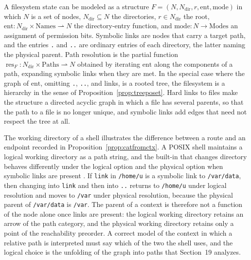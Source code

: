 \documentclass[11pt]{article}
\theoremstyle{definition}
\theoremstyle{remark}
\newcommand{\res}{\operatorname{res}}
\newcommand{\pfn}{\rightharpoonup}
\begin{document}
A filesystem state can be modeled as a structure $F=(N,N_{\mathrm{dir}},r,\mathrm{ent},\mathrm{mode})$ in which $N$ is a set of nodes, $N_{\mathrm{dir}}\subseteq N$ the directories, $r\in N_{\mathrm{dir}}$ the root, $\mathrm{ent}:N_{\mathrm{dir}}\times\mathrm{Names}\pfn N$ the directory-entry function, and $\mathrm{mode}:N\to\mathrm{Modes}$ an assignment of permission bits. Symbolic links are nodes that carry a target path, and the entries \texttt{.} and \texttt{..} are ordinary entries of each directory, the latter naming the physical parent. Path resolution is the partial function $\res_F:N_{\mathrm{dir}}\times\mathrm{Paths}\pfn N$ obtained by iterating $\mathrm{ent}$ along the components of a path, expanding symbolic links when they are met. In the special case where the graph of $\mathrm{ent}$, omitting \texttt{.}, \texttt{..}, and links, is a rooted tree, the filesystem is a hierarchy in the sense of Proposition~\ref{prop:treeposet}. Hard links to files make the structure a directed acyclic graph in which a file has several parents, so that the path to a file is no longer unique, and symbolic links add edges that need not respect the tree at all.

The working directory of a shell illustrates the difference between a route and an endpoint recorded in Proposition~\ref{prop:catfromctx}. A POSIX shell maintains a logical working directory as a path string, and the built-in that changes directory behaves differently under the logical option and the physical option when symbolic links are present \cite{posix}. If \texttt{link} in \texttt{/home/u} is a symbolic link to \texttt{/var/data}, then changing into \texttt{link} and then into \texttt{..} returns to \texttt{/home/u} under logical resolution and moves to \texttt{/var} under physical resolution, because the physical parent of \texttt{/var/data} is \texttt{/var}. The parent of a context is therefore not a function of the node alone once links are present: the logical working directory retains an arrow of the path category, and the physical working directory retains only a point of the reachability preorder. A correct model of the context in which a relative path is interpreted must say which of the two the shell uses, and the logical choice is the unfolding of the graph into paths that Section~19 analyzes.
\end{document}
